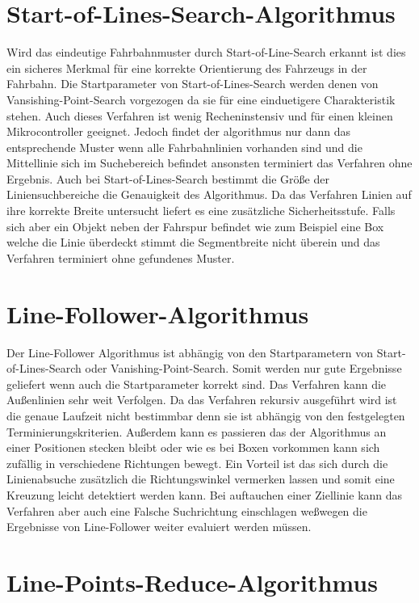 \section{Start-of-Lines-Search-Algorithmus}
\label{section:Start-of-Lines-Search-Algorithmus} 
Wird das eindeutige Fahrbahnmuster durch Start-of-Line-Search erkannt ist dies ein sicheres Merkmal für eine korrekte Orientierung des Fahrzeugs in der Fahrbahn. Die Startparameter von Start-of-Lines-Search werden denen von Vansishing-Point-Search vorgezogen da sie für eine einduetigere Charakteristik stehen. Auch dieses Verfahren ist wenig Recheninstensiv und für einen kleinen Mikrocontroller geeignet.
Jedoch findet der algorithmus nur dann das entsprechende Muster wenn alle Fahrbahnlinien vorhanden sind und die Mittellinie sich im Suchebereich befindet ansonsten terminiert das Verfahren ohne Ergebnis.
Auch bei Start-of-Lines-Search bestimmt die Gr\"o{\ss}e der Liniensuchbereiche die Genauigkeit des Algorithmus. Da das Verfahren Linien auf ihre korrekte Breite untersucht liefert es eine zus\"atzliche Sicherheitsstufe. Falls sich aber ein Objekt neben der Fahrspur befindet wie zum Beispiel eine Box welche die Linie überdeckt stimmt die Segmentbreite nicht überein und das Verfahren terminiert ohne gefundenes Muster.


\section{Line-Follower-Algorithmus}
\label{section:Line-Follower-Algorithmus}
Der Line-Follower Algorithmus ist abh\"angig von den Startparametern von Start-of-Lines-Search oder Vanishing-Point-Search. Somit werden nur gute Ergebnisse geliefert wenn auch die Startparameter korrekt sind.
Das Verfahren kann die Au{\ss}enlinien sehr weit Verfolgen. Da das Verfahren rekursiv ausgef\"uhrt wird ist die genaue Laufzeit nicht bestimmbar denn sie ist abh\"angig von den festgelegten Terminierungskriterien. Au{\ss}erdem kann es passieren das der Algorithmus an einer Positionen stecken bleibt oder wie es bei Boxen vorkommen kann sich zuf\"allig in verschiedene Richtungen bewegt.
Ein Vorteil ist das sich durch die Linienabsuche zus\"atzlich die Richtungswinkel vermerken lassen und somit eine Kreuzung leicht detektiert werden kann. Bei auftauchen einer Ziellinie kann das Verfahren aber auch eine Falsche Suchrichtung einschlagen we{\ss}wegen die Ergebnisse von Line-Follower weiter evaluiert werden m\"ussen.
 

\section{Line-Points-Reduce-Algorithmus}
\label{section:Line-Points-Reduce-Algorithmus}

